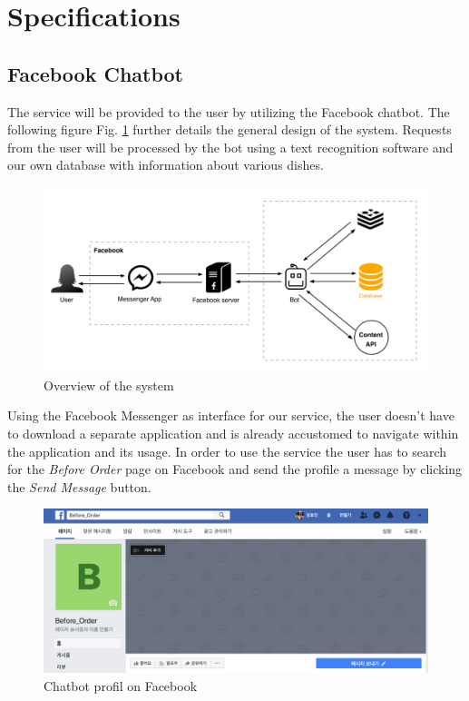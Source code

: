 \section{Specifications}
\subsection{Facebook Chatbot}
The service will be provided to the user by utilizing the Facebook chatbot. The following figure Fig. \ref{fig:facebook_overview} further details the general design of the system. Requests from the user will be processed by the bot using a text recognition software and our own database with information about various dishes.

\begin{figure}[htbp]
\centerline{\includegraphics[width=\linewidth]{./pictures/facebook_overview}}
\caption{Overview of the system}
\label{fig:facebook_overview}
\end{figure}
\FloatBarrier

Using the Facebook Messenger as interface for our service, the user doesn't have to download a separate application and is already accustomed to navigate within the application and its usage. In order to use the service the user has to search for the \emph{Before Order} page on Facebook and send the profile a message by clicking the \emph{Send Message} button.

\begin{figure}[htbp]
\centerline{\includegraphics[width=\linewidth]{./pictures/facebook_profil}}
\caption{Chatbot profil on Facebook}
\label{fig:facebook_profil}
\end{figure}
\FloatBarrier

